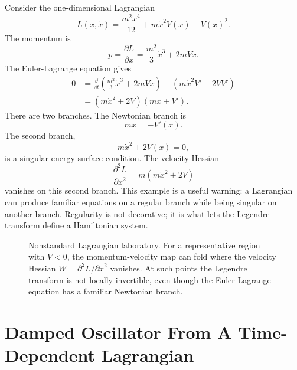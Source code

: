 Consider the one-dimensional Lagrangian
\[
  L(x,\dot x)
  =
  \frac{m^2\dot x^4}{12}
  +
  m\dot x^2V(x)
  -
  V(x)^2.
\]
The momentum is
\[
  p=\frac{\partial L}{\partial\dot x}
  =
  \frac{m^2}{3}\dot x^3+2mV\dot x.
\]
The Euler-Lagrange equation gives
\[
\begin{aligned}
  0
  &=
  \frac{\dd}{\dd t}
  \left(
    \frac{m^2}{3}\dot x^3+2mV\dot x
  \right)
  -
  \left(
    m\dot x^2V'-2VV'
  \right)\\
  &=
  (m\dot x^2+2V)(m\ddot x+V').
\end{aligned}
\]
There are two branches. The Newtonian branch is
\[
  m\ddot x=-V'(x).
\]
The second branch,
\[
  m\dot x^2+2V(x)=0,
\]
is a singular energy-surface condition. The velocity Hessian
\[
  \frac{\partial^2L}{\partial\dot x^2}
  =
  m(m\dot x^2+2V)
\]
vanishes on this second branch. This example is a useful warning: a Lagrangian
can produce familiar equations on a regular branch while being singular on
another branch. Regularity is not decorative; it is what lets the Legendre
transform define a Hamiltonian system.

\begin{figure}[htbp]
\centering
{}
\caption{Nonstandard Lagrangian laboratory. For a representative region with
\(V<0\), the momentum-velocity map can fold where the velocity Hessian
\(W=\partial^2L/\partial\dot x^2\) vanishes. At such points the Legendre
transform is not locally invertible, even though the Euler-Lagrange equation has
a familiar Newtonian branch.}
\label{fig:lab-nonstandard-legendre-fold}
\end{figure}
\FloatBarrier

\section{Damped Oscillator From A Time-Dependent Lagrangian}
\label{sec:lab-damped-oscillator}


